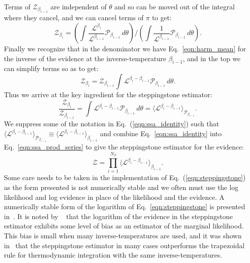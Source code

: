 Terms of $\mathcal{Z}_{\beta_{i-1}}$ are independent of $\theta$ and so can be moved out of the integral where they cancel, and we can cancel terms of $\pi$ to get:
\begin{equation}
    \mathcal{Z}_{\beta_i} = \left(\int \frac{ \mathcal{L}^{\beta_i} }{\mathcal{L}^{\beta_{i-1}}} \mathcal{P}_{\beta_{i-1}} \, d\theta\right) \bigg / \left(\int \frac{1}{ \mathcal{L}^{\beta_{i-1}}} \mathcal{P}_{\beta_{i-1}} \, d\theta\right).
\end{equation}
Finally we recognize that in the denominator we have Eq.~\ref{eqn:harm_mean} for the inverse of the evidence at the inverse-temperature $\beta_{i-1}$, and in the top we can simplify terms so as to get:
\begin{equation}
    \mathcal{Z}_{\beta_i} = \mathcal{Z}_{\beta_{i-1}} \int \mathcal{L}^{\beta_i - \beta_{i-1}}  \mathcal{P}_{\beta_{i-1}} \, d\theta.
\end{equation}
Thus we arrive at the key ingredient for the steppingstone estimator:
\begin{equation}\label{eqn:ssa_identity}
    \frac{\mathcal{Z}_{\beta_i}}{\mathcal{Z}_{\beta_{i-1}}} = \int \mathcal{L}^{\beta_i - \beta_{i-1}}  \mathcal{P}_{\beta_{i-1}} \, d\theta = \langle \mathcal{L}^{\beta_i - \beta_{i-1}} \rangle_{\mathcal{P}_{\beta_{i-1}}}.
\end{equation}
We suppress some of the notation in Eq.~(\ref{eqn:ssa_identity}) such that $\langle \mathcal{L}^{\beta_i - \beta_{i-1}} \rangle_{\mathcal{P}_{\beta_{i-1}}} \equiv \langle \mathcal{L}^{\beta_i - \beta_{i-1}} \rangle_{\beta_{i-1}}$ and combine Eq.~\ref{eqn:ssa_identity} into Eq.~\ref{eqn:ssa_prod_series} to  give the steppingstone estimator for the evidence:
\begin{equation}\label{eqn:steppingstone}
    \mathcal{Z} = \prod_{i=1}^{N_\beta} \langle \mathcal{L}^{\beta_i - \beta_{i-1}} \rangle_{\beta_{i-1}}. 
\end{equation}
Some care needs to be taken in the implementation of Eq.~(\ref{eqn:steppingstone}) as the form presented is not numerically stable and we often must use the log likelihood and log evidence in place of the likelihood and the evidence. A numerically stable form of the logarithm of Eq.~\ref{eqn:steppingstone} is presented in~\cite{xie2010improving}. It is noted by ~\cite{xie2010improving} that the logarithm of the evidence in the steppingstone estimator exhibits some level of bias as an estimator of the marginal likelihood. This bias is small when many inverse-temperatures are used, and it was shown in~\cite{xie2010improving} that the steppingstone estimator in many cases outperforms the trapezoidal rule for thermodynamic integration with the same inverse-temperatures.

